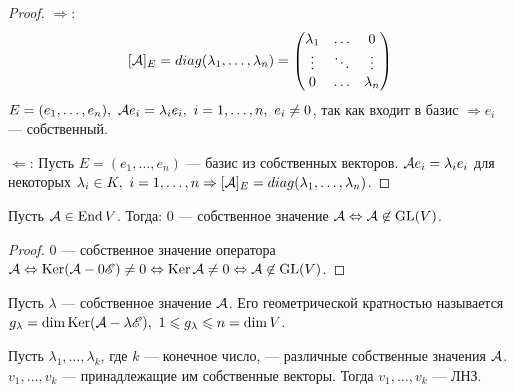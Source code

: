\documentclass[main]{subfiles}
\begin{document}
\begin{proof}
    $\Rightarrow$:
    \[ [\mathcal{A}]_E = diag(\lambda_1, \ldots, \lambda_n) = \begin{pmatrix}
            \lambda_1 & \ldots & 0         \\
            \vdots    & \ddots & \vdots    \\
            0         & \ldots & \lambda_n \\
        \end{pmatrix}\]
    $ E = (e_1, \ldots, e_n),\ \mathcal{A} e_i = \lambda_i e_i,\ i = 1, \ldots, n,\ e_i \neq 0 $,
    так как входит в базис $\Rightarrow e_i$ — собственный.

    $\Leftarrow$: Пусть  $E = (e_1, \ldots, e_n)$ — базис из собственных векторов.
    $\mathcal{A} e_i = \lambda_i e_i$ для некоторых $\lambda_i \in K, \ i = 1, \ldots, n
        \Rightarrow [\mathcal{A}]_E
        = diag(\lambda_1, \ldots, \lambda_n)$.
\end{proof}

\begin{lemma}
    Пусть $\mathcal{A} \in \operatorname{End} V$. Тогда: 0 — собственное значение $\mathcal{A}
        \Leftrightarrow \mathcal{A} \not\in \operatorname{GL}(V)$.
\end{lemma}

\begin{proof}
    0 — собственное значение оператора $\mathcal{A} \Leftrightarrow
        \operatorname{Ker} (\mathcal{A} - 0\mathscr{E}) \neq 0 \Leftrightarrow
        \operatorname{Ker} \mathcal{A} \neq 0 \Leftrightarrow \mathcal{A} \not\in \operatorname{GL}(V)$.
\end{proof}

\begin{definition} 
    Пусть $\lambda$ — собственное значение $\mathcal{A}$.
    Его геометрической кратностью называется
    $g_\lambda = \dim \operatorname{Ker} (\mathcal{A} -\lambda\mathscr{E}),\ 1 \leqslant g_\lambda \leqslant n = \dim V$.
\end{definition}

\begin{proposition}
    Пусть $\lambda_1, \ldots, \lambda_k$, где $k$ — конечное число, — различные собственные значения $\mathcal{A}$.
    $v_1, \ldots, v_k$ — принадлежащие им собственные векторы.
    Тогда  $v_1, \ldots, v_k$ — ЛНЗ.
\end{proposition}
\end{document}
